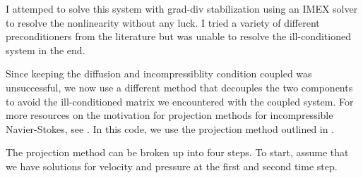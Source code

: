 \documentclass{article}
\begin{document}
   I attemped to solve this system with grad-div stabilization using an IMEX solver to resolve the nonlinearity without any luck. I tried a variety of different preconditioners from the literature \cite{gd1,gd2,gd3} but was unable to resolve the ill-conditioned system in the end.

   Since keeping the diffusion and incompressiblity condition coupled was unsuccessful, we now use a different method that decouples the two components to avoid the ill-conditioned matrix we encountered with the coupled system. For more resources on the motivation for projection methods for incompressible Navier-Stokes, see \cite{projection}. In this code, we use the projection method outlined in \cite{rotational}. 

   The projection method can be broken up into four steps. To start, assume that we have solutions for velocity and pressure at the first and second time step. 
\end{document}
